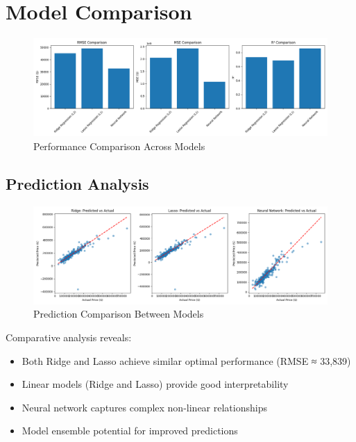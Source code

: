 \section{Model Comparison}
\begin{figure}[H]
    \centering
    \includegraphics[width=1.0\textwidth]{../model_comparison.png}
    \caption{Performance Comparison Across Models}
    \label{fig:model_comparison}
\end{figure}

\subsection{Prediction Analysis}
\begin{figure}[H]
    \centering
    \includegraphics[width=1.0\textwidth]{../prediction_comparison.png}
    \caption{Prediction Comparison Between Models}
    \label{fig:prediction_comparison}
\end{figure}

Comparative analysis reveals:
\begin{itemize}
    \item Both Ridge and Lasso achieve similar optimal performance (RMSE ≈ 33,839)
    \item Linear models (Ridge and Lasso) provide good interpretability
    \item Neural network captures complex non-linear relationships
    \item Model ensemble potential for improved predictions
\end{itemize}

